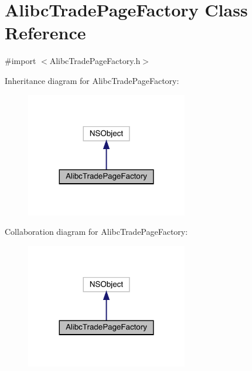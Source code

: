 \hypertarget{interface_alibc_trade_page_factory}{}\section{Alibc\+Trade\+Page\+Factory Class Reference}
\label{interface_alibc_trade_page_factory}


{\ttfamily \#import $<$Alibc\+Trade\+Page\+Factory.\+h$>$}



Inheritance diagram for Alibc\+Trade\+Page\+Factory\+:\nopagebreak
\begin{figure}[H]
\begin{center}
\leavevmode
\includegraphics[width=200pt]{interface_alibc_trade_page_factory__inherit__graph}
\end{center}
\end{figure}


Collaboration diagram for Alibc\+Trade\+Page\+Factory\+:\nopagebreak
\begin{figure}[H]
\begin{center}
\leavevmode
\includegraphics[width=200pt]{interface_alibc_trade_page_factory__coll__graph}
\end{center}
\end{figure}
